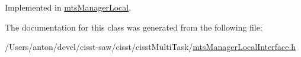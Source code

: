 Implemented in \hyperlink{classmts_manager_local_ac58e53b7cb5f77daf8cdcfb6cc0d0e1e}{mts\+Manager\+Local}.



The documentation for this class was generated from the following file\+:\begin{DoxyCompactItemize}
\item 
/\+Users/anton/devel/cisst-\/saw/cisst/cisst\+Multi\+Task/\hyperlink{mts_manager_local_interface_8h}{mts\+Manager\+Local\+Interface.\+h}\end{DoxyCompactItemize}

